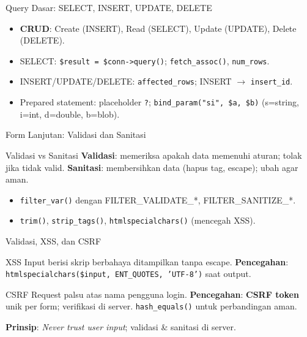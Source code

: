 \documentclass[handout]{beamer}
\begin{document}
\begin{frame}{Query Dasar: SELECT, INSERT, UPDATE, DELETE}
	\begin{itemize}
		\item \textbf{CRUD}: Create (INSERT), Read (SELECT), Update (UPDATE), Delete (DELETE).
		\item SELECT: \texttt{\$result = \$conn->query()}; \texttt{fetch\_assoc()}, \texttt{num\_rows}.
		\item INSERT/UPDATE/DELETE: \texttt{affected\_rows}; INSERT $\to$ \texttt{insert\_id}.
		\item Prepared statement: placeholder \texttt{?}; \texttt{bind\_param("si", \$a, \$b)} (s=string, i=int, d=double, b=blob).
	\end{itemize}
\end{frame}

\begin{frame}{Form Lanjutan: Validasi dan Sanitasi}
	\begin{block}{Validasi vs Sanitasi}
		\textbf{Validasi}: memeriksa apakah data memenuhi aturan; tolak jika tidak valid. \textbf{Sanitasi}: membersihkan data (hapus tag, escape); ubah agar aman.
	\end{block}
	\begin{itemize}
		\item \texttt{filter\_var()} dengan FILTER\_VALIDATE\_*, FILTER\_SANITIZE\_*.
		\item \texttt{trim()}, \texttt{strip\_tags()}, \texttt{htmlspecialchars()} (mencegah XSS).
	\end{itemize}
\end{frame}

\begin{frame}{Validasi, XSS, dan CSRF}
	\begin{block}{XSS}
		Input berisi skrip berbahaya ditampilkan tanpa escape. \textbf{Pencegahan}: \texttt{htmlspecialchars(\$input, ENT\_QUOTES, 'UTF-8')} saat output.
	\end{block}
	\begin{block}{CSRF}
		Request palsu atas nama pengguna login. \textbf{Pencegahan}: \textbf{CSRF token} unik per form; verifikasi di server. \texttt{hash\_equals()} untuk perbandingan aman.
	\end{block}
	\textbf{Prinsip}: \textit{Never trust user input}; validasi \& sanitasi di server.
\end{frame}
\end{document}
